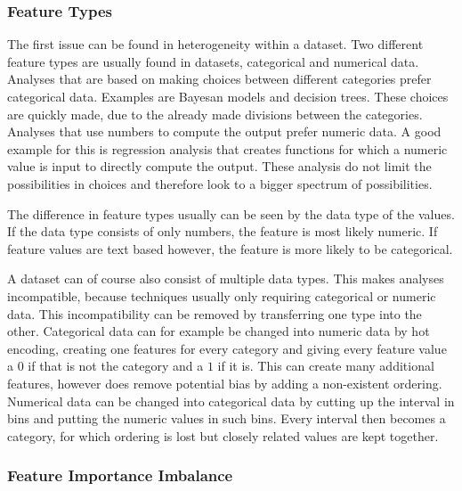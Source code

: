 \documentclass[10pt,a4paper]{report}
\begin{document}
	\subsubsection{Feature Types}
	\label{DEsubsec:FeatureTypes}
	
	The first issue can be found in heterogeneity within a dataset. Two different feature types are usually found in datasets, categorical and numerical data. Analyses that are based on making choices between different categories prefer categorical data. Examples are Bayesan models\cite{congdon2005bayesian} and decision trees\cite{safavian1991survey}. These choices are quickly made, due to the already made divisions between the categories. Analyses that use numbers to compute the output prefer numeric data. A good example for this is regression analysis\cite{gelman2006data} that creates functions for which a numeric value is input to directly compute the output. These analysis do not limit the possibilities in choices and therefore look to a bigger spectrum of possibilities.
		
	The difference in feature types usually can be seen by the data type of the values. If the data type consists of only numbers, the feature is most likely numeric. If feature values are text based however, the feature is more likely to be categorical.
	
	A dataset can of course also consist of multiple data types. This makes analyses incompatible, because techniques usually only requiring categorical or numeric data. This incompatibility can be removed by transferring one type into the other. Categorical data can for example be changed into numeric data by hot encoding\cite{guo2016entity}, creating one features for every category and giving every feature value a $0$ if that is not the category and a $1$ if it is. This can create many additional features, however does remove potential bias by adding a non-existent ordering. Numerical data can be changed into categorical data by cutting up the interval in bins and putting the numeric values in such bins\cite{larose2014discovering}. Every interval then becomes a category, for which ordering is lost but closely related values are kept together.  
	
	\subsubsection{Feature Importance Imbalance}
	\label{DEsubsec:Normalisation}
	
\end{document}
